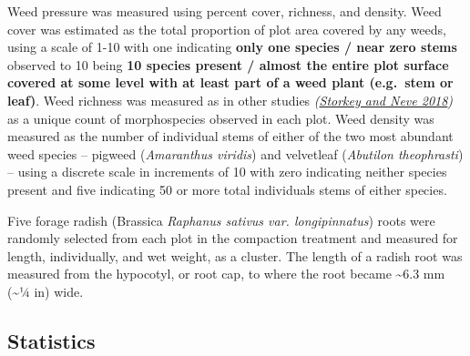 \documentclass[
  12pt,
]{article}
\begin{document}
Weed pressure was measured using percent cover, richness, and density.
Weed cover was estimated as the total proportion of plot area covered by any weeds,
using a scale of 1-10 with one indicating \textbf{only one species / near zero stems} observed to 10 being \textbf{10 species present / almost the entire plot surface covered at some level with at least part of a weed plant (e.g.~stem or leaf)}.
Weed richness was measured as in other studies \emph{(\protect\hyperlink{ref-storkey18}{Storkey and Neve 2018})} as a unique count of morphospecies observed in each plot.
Weed density was measured as the number of individual stems of either of the two most abundant weed species -- pigweed (\emph{Amaranthus viridis}) and velvetleaf (\emph{Abutilon theophrasti}) -- using a discrete scale in increments of 10 with zero indicating neither species present and five indicating 50 or more total individuals stems of either species.

Five forage radish (Brassica \emph{Raphanus sativus var. longipinnatus}) roots were randomly selected from each plot in the compaction treatment and measured for length, individually, and wet weight, as a cluster.
The length of a radish root was measured from the hypocotyl, or root cap, to where the root became \textasciitilde6.3 mm (\textasciitilde1⁄4 in) wide.

\hypertarget{statistics}{%
\subsection{Statistics}\label{statistics}}
\end{document}
